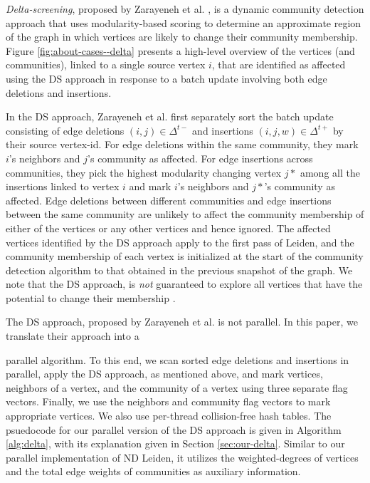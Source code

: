 \textit{Delta-screening}, proposed by Zarayeneh et al. \cite{com-zarayeneh21}, is a dynamic community detection approach that uses modularity-based scoring to determine an approximate region of the graph in which vertices are likely to change their community membership. Figure \ref{fig:about-cases--delta} presents a high-level overview of the vertices (and communities), linked to a single source vertex $i$, that are identified as affected using the DS approach in response to a batch update involving both edge deletions and insertions. In the DS approach, Zarayeneh et al. first separately sort the batch update consisting of edge deletions $(i, j) \in \Delta^{t-}$ and insertions $(i, j, w) \in \Delta^{t+}$ by their source vertex-id. For edge deletions within the same community, they mark $i$'s neighbors and $j$'s community as affected. For edge insertions across communities, they pick the highest modularity changing vertex $j*$ among all the insertions linked to vertex $i$ and mark $i$'s neighbors and $j*$'s community as affected. Edge deletions between different communities and edge insertions between the same community are unlikely to affect the community membership of either of the vertices or any other vertices and hence ignored. The affected vertices identified by the DS approach apply to the first pass of Leiden, and the community membership of each vertex is initialized at the start of the community detection algorithm to that obtained in the previous snapshot of the graph. We note that the DS approach, is \textit{not} guaranteed to explore all vertices that have the potential to change their membership \cite{com-zarayeneh21}.

The DS approach, proposed by Zarayeneh et al. \cite{com-zarayeneh21} is not parallel. In this paper, we translate their approach into a parallel algorithm. To this end, we scan sorted edge deletions and insertions in parallel, apply the DS approach, as mentioned above, and mark vertices, neighbors of a vertex, and the community of a vertex using three separate flag vectors. Finally, we use the neighbors and community flag vectors to mark appropriate vertices. We also use per-thread collision-free hash tables. The psuedocode for our parallel version of the DS approach is given in Algorithm \ref{alg:delta}, with its explanation given in Section \ref{sec:our-delta}. Similar to our parallel implementation of ND Leiden, it utilizes the weighted-degrees of vertices and the total edge weights of communities as auxiliary information.
